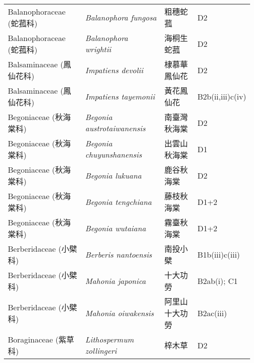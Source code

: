 \begin{longtable}{p{3cm}p{5cm}p{3cm}p{4cm}}
    Balanophoraceae (蛇菰科) & \textit{Balanophora fungosa}  & 粗穗蛇菰 & D2 \index{Balanophora@\textit{Balanophora}!fungosa@\textit{fungosa}}  \index{粗穗蛇菰} \\
    Balanophoraceae (蛇菰科) & \textit{Balanophora wrightii}  & 海桐生蛇菰 & D2 \index{Balanophora@\textit{Balanophora}!wrightii@\textit{wrightii}}  \index{海桐生蛇菰} \\
    Balsaminaceae (鳳仙花科) & \textit{Impatiens devolii}  & 棣慕華鳳仙花 & D2 \index{Impatiens@\textit{Impatiens}!devolii@\textit{devolii}}  \index{棣慕華鳳仙花} \\
    Balsaminaceae (鳳仙花科) & \textit{Impatiens tayemonii}  & 黃花鳳仙花 & B2b(ii,iii)c(iv) \index{Impatiens@\textit{Impatiens}!tayemonii@\textit{tayemonii}}  \index{黃花鳳仙花} \\
    Begoniaceae (秋海棠科) & \textit{Begonia austrotaiwanensis}  & 南臺灣秋海棠 & D2 \index{Begonia@\textit{Begonia}!austrotaiwanensis@\textit{austrotaiwanensis}}  \index{南臺灣秋海棠} \\
    Begoniaceae (秋海棠科) & \textit{Begonia chuyunshanensis}  & 出雲山秋海棠 & D1 \index{Begonia@\textit{Begonia}!chuyunshanensis@\textit{chuyunshanensis}}  \index{出雲山秋海棠} \\
    Begoniaceae (秋海棠科) & \textit{Begonia lukuana}  & 鹿谷秋海棠 & D2 \index{Begonia@\textit{Begonia}!lukuana@\textit{lukuana}}  \index{鹿谷秋海棠} \\
    Begoniaceae (秋海棠科) & \textit{Begonia tengchiana}  & 藤枝秋海棠 & D1+2 \index{Begonia@\textit{Begonia}!tengchiana@\textit{tengchiana}}  \index{藤枝秋海棠} \\
    Begoniaceae (秋海棠科) & \textit{Begonia wutaiana}  & 霧臺秋海棠 & D1+2 \index{Begonia@\textit{Begonia}!wutaiana@\textit{wutaiana}}  \index{霧臺秋海棠} \\
    Berberidaceae (小檗科) & \textit{Berberis nantoensis}  & 南投小檗 & B1b(iii)c(iii) \index{Berberis@\textit{Berberis}!nantoensis@\textit{nantoensis}}  \index{南投小檗} \\
    Berberidaceae (小檗科) & \textit{Mahonia japonica}  & 十大功勞 & B2ab(i); C1 \index{Mahonia@\textit{Mahonia}!japonica@\textit{japonica}}  \index{十大功勞} \\
    Berberidaceae (小檗科) & \textit{Mahonia oiwakensis}  & 阿里山十大功勞 & B2ac(iii) \index{Mahonia@\textit{Mahonia}!oiwakensis@\textit{oiwakensis}}  \index{阿里山十大功勞} \\
    Boraginaceae (紫草科) & \textit{Lithospermum zollingeri}  & 梓木草 & D2 \index{Lithospermum@\textit{Lithospermum}!zollingeri@\textit{zollingeri}}  \index{梓木草} \\

\end{longtable}
